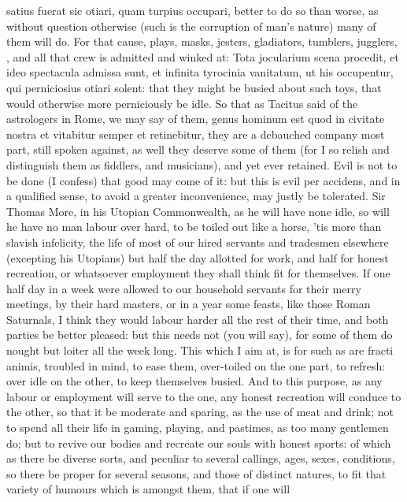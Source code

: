{satius fuerat sic otiari, quam turpius occupari, better to do so than
worse, as without question otherwise (such is the corruption of man's
nature) many of them will do. For that cause, plays, masks, jesters,
gladiators, tumblers, jugglers, \etc{}, and all that crew is admitted and
winked at: Tota jocularium scena procedit, et ideo spectacula
admissa sunt, et infinita tyrocinia vanitatum, ut his occupentur, qui
perniciosius otiari solent: that they might be busied about such toys,
that would otherwise more perniciously be idle. So that as
Tacitus said of the astrologers in Rome, we may say of them,
genus hominum est quod in civitate nostra et vitabitur semper et
retinebitur, they are a debauched company most part, still spoken
against, as well they deserve some of them (for I so relish and
distinguish them as fiddlers, and musicians), and yet ever retained.
Evil is not to be done (I confess) that good may come of it: but this
is evil per accidens, and in a qualified sense, to avoid a greater
inconvenience, may justly be tolerated. Sir Thomas More, in his Utopian
Commonwealth, as he will have none idle, so will he have no man
labour over hard, to be toiled out like a horse, 'tis more than slavish
infelicity, the life of most of our hired servants and tradesmen
elsewhere (excepting his Utopians) but half the day allotted for work,
and half for honest recreation, or whatsoever employment they shall
think fit for themselves. If one half day in a week were allowed to our
household servants for their merry meetings, by their hard masters, or
in a year some feasts, like those Roman Saturnals, I think they would
labour harder all the rest of their time, and both parties be better
pleased: but this needs not (you will say), for some of them do nought
but loiter all the week long.
This which I aim at, is for such as are fracti animis, troubled in
mind, to ease them, over-toiled on the one part, to refresh: over idle
on the other, to keep themselves busied. And to this purpose, as any
labour or employment will serve to the one, any honest recreation will
conduce to the other, so that it be moderate and sparing, as the use of
meat and drink; not to spend all their life in gaming, playing, and
pastimes, as too many gentlemen do; but to revive our bodies and
recreate our souls with honest sports: of which as there be diverse
sorts, and peculiar to several callings, ages, sexes, conditions, so
there be proper for several seasons, and those of distinct natures, to
fit that variety of humours which is amongst them, that if one will
}
